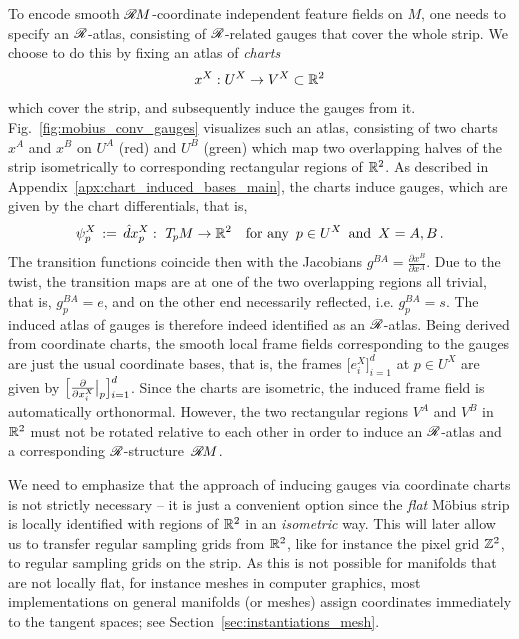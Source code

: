 To encode smooth $\mathscr{R}\mkern-1.8muM$-coordinate independent feature fields on $M$, one needs to specify an $\mathscr{R}$-atlas, consisting of $\mathscr{R}$-related gauges that cover the whole strip.
We choose to do this by fixing an atlas of \emph{charts}
\begin{align}
    x^X: U^X \to V^X \subset \mathbb{R}^2
\end{align}
which cover the strip, and subsequently induce the gauges from it.
Fig.~\ref{fig:mobius_conv_gauges} visualizes such an atlas, consisting of two charts $x^A$ and $x^B$ on $U^A$ (red) and $U^B$ (green) which map two overlapping halves of the strip isometrically to corresponding rectangular regions of $\mathbb{R}^2$.
As described in Appendix~\ref{apx:chart_induced_bases_main}, the charts induce gauges, which are given by the chart differentials, that is,
\begin{align}
    \psi_p^X \,:=\, \hat{d}x^X_p :\ T_{\mkern-1.5mu p}\mkern-.5muM \to \mathbb{R}^2 \ \ \ \textup{for any}\,\ p\in U^X\,\ \text{and}\,\ X=A,B \,.
\end{align}
The transition functions coincide then with the Jacobians
$g^{BA} = \frac{\partial x^B}{\partial x^A}$.
Due to the twist, the transition maps are at one of the two overlapping regions all trivial, that is, $g_p^{BA} = e$, and on the other end necessarily reflected, i.e. $g_p^{BA} = s$.
The induced atlas of gauges is therefore indeed identified as an $\mathscr{R}$-atlas.
Being derived from coordinate charts, the smooth local frame fields corresponding to the gauges are just the usual coordinate bases, that is, the frames $\big[e_i^X \big]_{i=1}^d$ at $p\in U^X$ are given by
$\pig[\frac{\partial}{\partial x_i^X} \mkern-1mu\big|_p \pig] \raisebox{-2pt}{$\rule{0pt}{11pt}_{i=1}^d$}$.
Since the charts are isometric, the induced frame field is automatically orthonormal.
However, the two rectangular regions $V^A$ and $V^B$ in $\mathbb{R}^2$ must not be rotated relative to each other in order to induce an $\mathscr{R}$-atlas and a corresponding $\mathscr{R}$-structure~$\mathscr{R}\mkern-1.8muM$.

We need to emphasize that the approach of inducing gauges via coordinate charts is not strictly necessary
-- it is just a convenient option since the \emph{flat} M\"obius strip is locally identified with regions of $\mathbb{R}^2$ in an \emph{isometric} way.
This will later allow us to transfer regular sampling grids from $\mathbb{R}^2$, like for instance the pixel grid $\mathbb{Z}^2$, to regular sampling grids on the strip.
As this is not possible for manifolds that are not locally flat, for instance meshes in computer graphics, most implementations on general manifolds (or meshes) assign coordinates immediately to the tangent spaces; see Section~\ref{sec:instantiations_mesh}.


